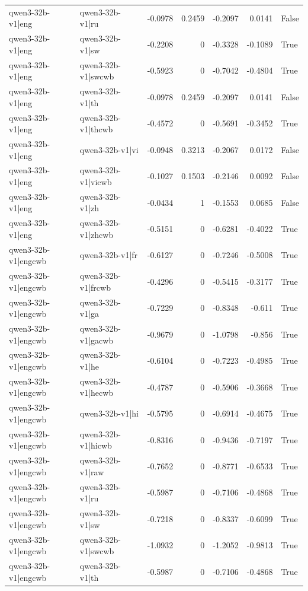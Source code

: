 \begin{table}
\begin{tabular}{l l r r r r l}
qwen3-32b-v1|eng & qwen3-32b-v1|ru & -0.0978 & 0.2459 & -0.2097 & 0.0141 & False \\
qwen3-32b-v1|eng & qwen3-32b-v1|sw & -0.2208 & 0 & -0.3328 & -0.1089 & True \\
qwen3-32b-v1|eng & qwen3-32b-v1|swcwb & -0.5923 & 0 & -0.7042 & -0.4804 & True \\
qwen3-32b-v1|eng & qwen3-32b-v1|th & -0.0978 & 0.2459 & -0.2097 & 0.0141 & False \\
qwen3-32b-v1|eng & qwen3-32b-v1|thcwb & -0.4572 & 0 & -0.5691 & -0.3452 & True \\
qwen3-32b-v1|eng & qwen3-32b-v1|vi & -0.0948 & 0.3213 & -0.2067 & 0.0172 & False \\
qwen3-32b-v1|eng & qwen3-32b-v1|vicwb & -0.1027 & 0.1503 & -0.2146 & 0.0092 & False \\
qwen3-32b-v1|eng & qwen3-32b-v1|zh & -0.0434 & 1 & -0.1553 & 0.0685 & False \\
qwen3-32b-v1|eng & qwen3-32b-v1|zhcwb & -0.5151 & 0 & -0.6281 & -0.4022 & True \\
qwen3-32b-v1|engcwb & qwen3-32b-v1|fr & -0.6127 & 0 & -0.7246 & -0.5008 & True \\
qwen3-32b-v1|engcwb & qwen3-32b-v1|frcwb & -0.4296 & 0 & -0.5415 & -0.3177 & True \\
qwen3-32b-v1|engcwb & qwen3-32b-v1|ga & -0.7229 & 0 & -0.8348 & -0.611 & True \\
qwen3-32b-v1|engcwb & qwen3-32b-v1|gacwb & -0.9679 & 0 & -1.0798 & -0.856 & True \\
qwen3-32b-v1|engcwb & qwen3-32b-v1|he & -0.6104 & 0 & -0.7223 & -0.4985 & True \\
qwen3-32b-v1|engcwb & qwen3-32b-v1|hecwb & -0.4787 & 0 & -0.5906 & -0.3668 & True \\
qwen3-32b-v1|engcwb & qwen3-32b-v1|hi & -0.5795 & 0 & -0.6914 & -0.4675 & True \\
qwen3-32b-v1|engcwb & qwen3-32b-v1|hicwb & -0.8316 & 0 & -0.9436 & -0.7197 & True \\
qwen3-32b-v1|engcwb & qwen3-32b-v1|raw & -0.7652 & 0 & -0.8771 & -0.6533 & True \\
qwen3-32b-v1|engcwb & qwen3-32b-v1|ru & -0.5987 & 0 & -0.7106 & -0.4868 & True \\
qwen3-32b-v1|engcwb & qwen3-32b-v1|sw & -0.7218 & 0 & -0.8337 & -0.6099 & True \\
qwen3-32b-v1|engcwb & qwen3-32b-v1|swcwb & -1.0932 & 0 & -1.2052 & -0.9813 & True \\
qwen3-32b-v1|engcwb & qwen3-32b-v1|th & -0.5987 & 0 & -0.7106 & -0.4868 & True \\

\end{tabular}
\end{table}
